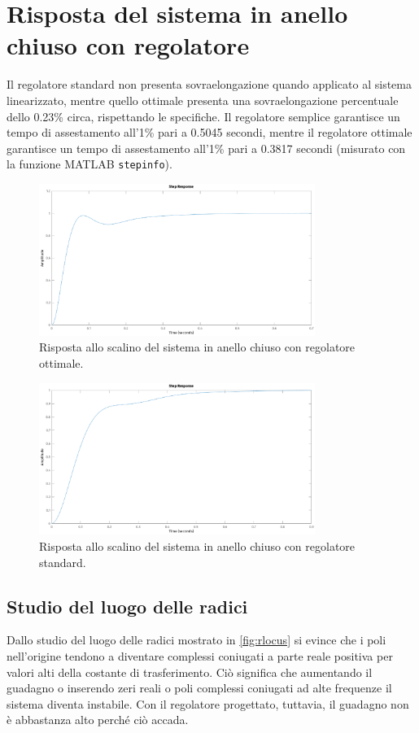 \documentclass[a4paper]{article}
\begin{document}
\section{Risposta del sistema in anello chiuso con regolatore}
Il regolatore standard non presenta sovraelongazione quando applicato al sistema linearizzato, mentre quello ottimale presenta una sovraelongazione percentuale dello 0.23\% circa, rispettando le specifiche.
Il regolatore semplice garantisce un tempo di assestamento all'1\% pari a 0.5045 secondi, mentre il regolatore ottimale garantisce un tempo di assestamento all'1\% pari a 0.3817 secondi (misurato con la funzione MATLAB \texttt{stepinfo}).
\begin{figure}[h!]
    \centering
    \includegraphics[width=0.8\textwidth]{step_opt}
    \caption{Risposta allo scalino del sistema in anello chiuso con regolatore ottimale.}
    \label{fig:step_opt}
    \end{figure}
\begin{figure}[h!]
    \centering
    \includegraphics[width=0.8\textwidth]{step_sta}
    \caption{Risposta allo scalino del sistema in anello chiuso con regolatore standard.}
    \label{fig:step_sta}
\end{figure}

\subsection{Studio del luogo delle radici}
Dallo studio del luogo delle radici mostrato in \cref{fig:rlocus} si evince che i poli nell'origine tendono a diventare complessi coniugati a parte reale positiva per valori alti della costante di trasferimento. 
Ciò significa che aumentando il guadagno o inserendo zeri reali o poli complessi coniugati ad alte frequenze il sistema diventa instabile.
Con il regolatore progettato, tuttavia, il guadagno non è abbastanza alto perché ciò accada.
\end{document}
